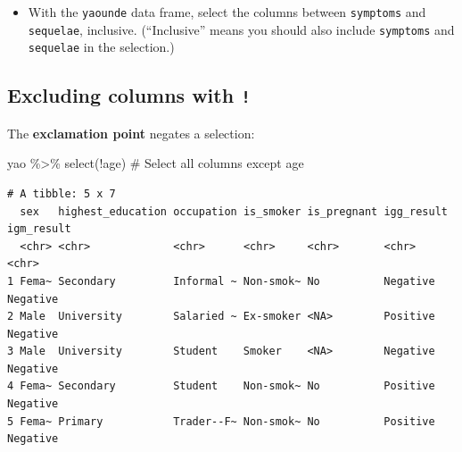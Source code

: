 \documentclass[
  letterpaper,
  DIV=11,
  numbers=noendperiod]{scrreprt}
\newenvironment{Shaded}{\begin{snugshade}}{\end{snugshade}}
\newcommand{\CommentTok}[1]{\textcolor[rgb]{0.37,0.37,0.37}{#1}}
\newcommand{\FunctionTok}[1]{\textcolor[rgb]{0.28,0.35,0.67}{#1}}
\newcommand{\NormalTok}[1]{\textcolor[rgb]{0.00,0.23,0.31}{#1}}
\newcommand{\SpecialCharTok}[1]{\textcolor[rgb]{0.37,0.37,0.37}{#1}}
\providecommand{\tightlist}{%
  \setlength{\itemsep}{0pt}\setlength{\parskip}{0pt}}\usepackage{longtable,booktabs,array}
\begin{document}
\begin{tcolorbox}[enhanced jigsaw, titlerule=0mm, colback=white, left=2mm, breakable, opacitybacktitle=0.6, colbacktitle=quarto-callout-tip-color!10!white, colframe=quarto-callout-tip-color-frame, bottomtitle=1mm, opacityback=0, coltitle=black, arc=.35mm, toptitle=1mm, title=\textcolor{quarto-callout-tip-color}{\faLightbulb}\hspace{0.5em}{Practice}, leftrule=.75mm, toprule=.15mm, bottomrule=.15mm, rightrule=.15mm]

\begin{itemize}
\tightlist
\item
  With the \texttt{yaounde} data frame, select the columns between
  \texttt{symptoms} and \texttt{sequelae}, inclusive. (``Inclusive''
  means you should also include \texttt{symptoms} and \texttt{sequelae}
  in the selection.)
\end{itemize}

\end{tcolorbox}

\subsection{\texorpdfstring{Excluding columns with
\texttt{!}}{Excluding columns with !}}\label{excluding-columns-with}

The \textbf{exclamation point} negates a selection:

\begin{Shaded}
\begin{Highlighting}[]
\NormalTok{yao }\SpecialCharTok{\%\textgreater{}\%} \FunctionTok{select}\NormalTok{(}\SpecialCharTok{!}\NormalTok{age) }\CommentTok{\# Select all columns except \textasciigrave{}age\textasciigrave{}}
\end{Highlighting}
\end{Shaded}

\begin{verbatim}
# A tibble: 5 x 7
  sex   highest_education occupation is_smoker is_pregnant igg_result igm_result
  <chr> <chr>             <chr>      <chr>     <chr>       <chr>      <chr>     
1 Fema~ Secondary         Informal ~ Non-smok~ No          Negative   Negative  
2 Male  University        Salaried ~ Ex-smoker <NA>        Positive   Negative  
3 Male  University        Student    Smoker    <NA>        Negative   Negative  
4 Fema~ Secondary         Student    Non-smok~ No          Positive   Negative  
5 Fema~ Primary           Trader--F~ Non-smok~ No          Positive   Negative  
\end{verbatim}
\end{document}
